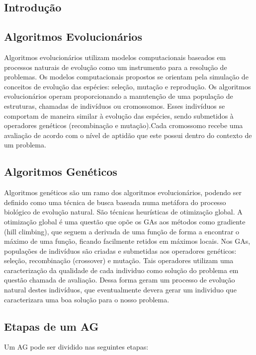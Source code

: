 \documentclass[twoside]{article}
\begin{document}
\begin{multicols}{2} %

\section{Introdução}

\subsection{Algoritmos Evolucionários}
Algoritmos evolucionários utilizam modelos computacionais baseados em processos naturais de evolução como um instrumento para a resolução de problemas. Os modelos computacionais propostos se orientam pela simulação de conceitos de evolução das espécies: seleção, mutação e reprodução. Os algoritmos evolucionários operam proporcionando a manutenção de uma população de estruturas, chamadas de indivíduos ou cromossomos. Esses indivíduos se comportam de maneira similar à evolução das espécies, sendo submetidos à operadores genéticos (recombinação e mutação).Cada cromossomo recebe uma avaliação de acordo com o nível de aptidão que este possui dentro do contexto de um problema.

\subsection{Algoritmos Genéticos}
Algoritmos genéticos são um ramo dos algoritmos evolucionários, podendo ser definido como uma técnica de busca baseada numa metáfora do processo biológico de evolução natural. São técnicas heurísticas de otimização global. A otimização global é uma questão que opõe os GAs aos métodos como gradiente (hill climbing), que seguem a derivada de uma função de forma a encontrar o máximo de uma função, ficando facilmente retidos em máximos locais. Nos GAs, populações de indivíduos são criadas e submetidas aos operadores genéticos: seleção, recombinação (crossover) e mutação. Tais operadores utilizam uma caracterização da qualidade de cada individuo como solução do problema em questão chamada de avaliação. Dessa forma geram um processo de evolução natural destes indivíduos, que eventualmente devera gerar um individuo que caracterizara uma boa solução para o nosso problema.

\subsection{Etapas de um AG}
Um AG pode ser dividido nas seguintes etapas:


\end{multicols}
\end{document}
